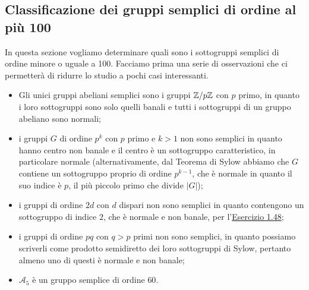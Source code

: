 \documentclass[11pt]{scrartcl}
\begin{document}
\newpage

\subsection{Classificazione dei gruppi semplici di ordine al più 100}

In questa sezione vogliamo determinare quali sono i sottogruppi semplici di 
ordine minore o uguale a 100. Facciamo prima una serie di osservazioni che 
ci permetterà di ridurre lo studio a pochi casi interessanti.

\begin{itemize}
    \item Gli unici gruppi abeliani semplici sono i gruppi ${\mathbb Z}/p{\mathbb Z}$ con $p$ primo,
    in quanto i loro sottogruppi sono solo quelli banali e tutti i sottogruppi
    di un gruppo abeliano sono normali;
    \item i gruppi $G$ di ordine $p^k$ con $p$ primo e $k > 1$ non sono semplici
    in quanto hanno centro non banale e il centro è un sottogruppo caratteristico,
    in particolare normale (alternativamente, dal Teorema di Sylow abbiamo che 
    $G$ contiene un sottogruppo proprio di ordine $p^{k - 1}$, che è normale in quanto
    il suo indice è $p$, il più piccolo primo che divide $|G|$);
    \item i gruppi di ordine $2d$ con $d$ dispari non sono semplici in quanto
    contengono un sottogruppo di indice $2$, che è normale e non banale, per 
    l'\hyperref[ex1.0]{Esercizio 1.48};
    \item i gruppi di ordine $pq$ con $q > p$ primi non sono semplici, in
    quanto possiamo scriverli come prodotto semidiretto dei loro sottogruppi
    di Sylow, pertanto almeno uno di questi è normale e non banale;
    \item $\mathcal{A}_5$ è un gruppo semplice di ordine $60$.
\end{itemize}
\end{document}
